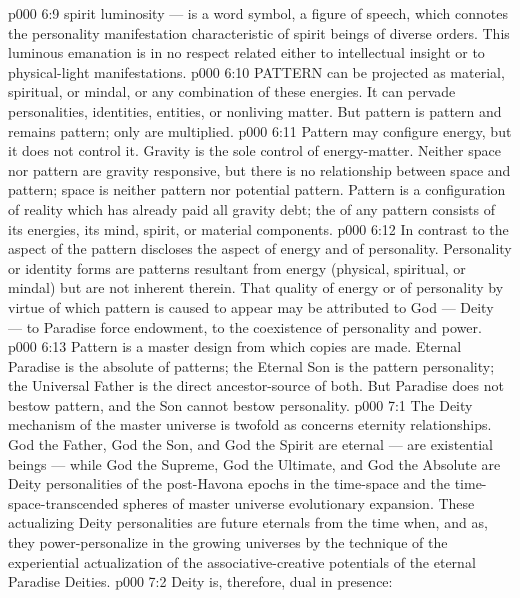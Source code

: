 \vs p000 6:9 \pc {} spirit luminosity --- is a word symbol, a figure of speech, which connotes the personality manifestation characteristic of spirit beings of diverse orders. This luminous emanation is in no respect related either to intellectual insight or to physical\hyp{}light manifestations.
\vs p000 6:10 \pc PATTERN can be projected as material, spiritual, or mindal, or any combination of these energies. It can pervade personalities, identities, entities, or nonliving matter. But pattern is pattern and remains pattern; only  are multiplied.
\vs p000 6:11 Pattern may configure energy, but it does not control it. Gravity is the sole control of energy\hyp{}matter. Neither space nor pattern are gravity responsive, but there is no relationship between space and pattern; space is neither pattern nor potential pattern. Pattern is a configuration of reality which has already paid all gravity debt; the  of any pattern consists of its energies, its mind, spirit, or material components.
\vs p000 6:12 In contrast to the aspect of the  pattern discloses the  aspect of energy and of personality. Personality or identity forms are patterns resultant from energy (physical, spiritual, or mindal) but are not inherent therein. That quality of energy or of personality by virtue of which pattern is caused to appear may be attributed to God --- Deity --- to Paradise force endowment, to the coexistence of personality and power.
\vs p000 6:13 Pattern is a master design from which copies are made. Eternal Paradise is the absolute of patterns; the Eternal Son is the pattern personality; the Universal Father is the direct ancestor\hyp{}source of both. But Paradise does not bestow pattern, and the Son cannot bestow personality.
\vs p000 7:1 The Deity mechanism of the master universe is twofold as concerns eternity relationships. God the Father, God the Son, and God the Spirit are eternal --- are existential beings --- while God the Supreme, God the Ultimate, and God the Absolute are  Deity personalities of the post\hyp{}Havona epochs in the time\hyp{}space and the time\hyp{}space\hyp{}transcended spheres of master universe evolutionary expansion. These actualizing Deity personalities are future eternals from the time when, and as, they power\hyp{}personalize in the growing universes by the technique of the experiential actualization of the associative\hyp{}creative potentials of the eternal Paradise Deities.
\vs p000 7:2 Deity is, therefore, dual in presence:
